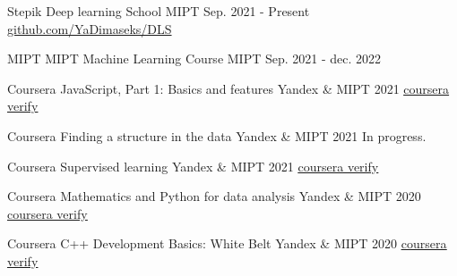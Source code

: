 

\begin{cventries}

    \cventry
    {Stepik} %
    {Deep learning School} %
    {MIPT} %
    {Sep. 2021 - Present} %
    {\href{https://github.com/YaDimaseks/DLS}{github.com/YaDimaseks/DLS}}

    
    \cventry
    {MIPT} %
    {MIPT Machine Learning Course} %
    {MIPT} %
    {Sep. 2021 - dec. 2022} %
    {
    }

    \cventry
    {Coursera} %
    {JavaScript, Part 1: Basics and features} %
    {Yandex \& MIPT} %
    {2021} %
    {
        \href{https://www.coursera.org/account/accomplishments/verify/47DEL9RNYNQ7}{\underline{coursera verify}}
    }

    \cventry
    {Coursera} %
    {Finding a structure in the data} %
    {Yandex \& MIPT} %
    {2021} %
    {
        In progress.
    }

    \cventry
    {Coursera} %
    {Supervised learning} %
    {Yandex \& MIPT} %
    {2021} %
    {
        \href{https://www.coursera.org/account/accomplishments/verify/G5M85CT4FDCZ}{\underline{coursera verify}}
    }

    \cventry
    {Coursera} %
    {Mathematics and Python for data analysis} %
    {Yandex \& MIPT} %
    {2020} %
    {
        \href{https://www.coursera.org/account/accomplishments/verify/TC28QAC29LHB}{\underline{coursera verify}}
    }

    \cventry
    {Coursera} %
    {C++ Development Basics: White Belt} %
    {Yandex \& MIPT} %
    {2020} %
    {
        \href{https://www.coursera.org/account/accomplishments/verify/Q5SAH9VGTTA3}{\underline{coursera verify}}
    }
\end{cventries}
